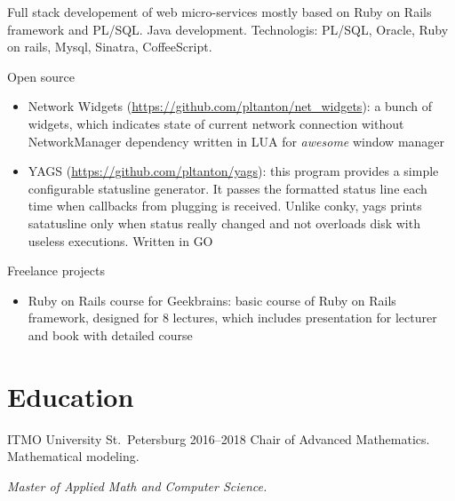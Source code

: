\documentclass{cv}
\begin{document}
\begin{cvblock}{%
		}

	Full stack developement of web micro-services mostly based on Ruby on Rails framework and PL/SQL\@.
	Java development. Technologis: PL/SQL, Oracle, Ruby on rails, Mysql, Sinatra, CoffeeScript.
\end{cvblock}

\begin{cvblock}{Open source}
	\begin{itemize}
		\item Network Widgets
		      (\url{https://github.com/pltanton/net_widgets}):
		      a bunch of widgets, which indicates state of current network connection
		      without NetworkManager dependency written in LUA for
		      \textit{awesome} window manager
		\item YAGS
		      (\url{https://github.com/pltanton/yags}):
		      this program provides a simple configurable statusline generator. It
		      passes the formatted status line each time when callbacks from plugging
		      is received. Unlike conky, yags prints satatusline only when status
		      really changed and not overloads disk with useless executions. Written in
		      GO

	\end{itemize}
\end{cvblock}

\begin{cvblock}{Freelance projects}
	\begin{itemize}
		\item Ruby on Rails course for Geekbrains:
		      basic course of Ruby on Rails framework, designed for 8 lectures, which
		      includes presentation for lecturer and book with detailed course
	\end{itemize}
\end{cvblock}

\section{Education}

\begin{cvblock}{%
		\blocktitle
		{ITMO University}
		{St.~Petersburg}
		{}
		{2016--2018}}
	Chair of Advanced Mathematics. Mathematical modeling.
	\vspace{1em}

	\textit{Master of Applied Math and Computer Science.}
\end{cvblock}
\end{document}
